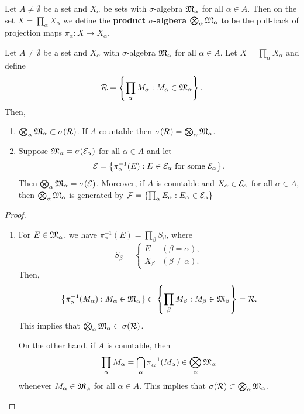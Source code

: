 \documentclass[a4paper]{article}
\begin{document}
\begin{defi}
  Let $A \neq \emptyset$ be a set and $X_\alpha$ be sets
  with $\sigma$-algebra $\mathfrak{M}_\alpha$ for all
    $\alpha \in A$. Then on the set $X = \prod_\alpha X_\alpha$
    we define the \textbf{product $\sigma$-algbera}
    $\bigotimes_\alpha \mathfrak{M}_\alpha$ to be the
    pull-back of projection maps
    $\pi_\alpha : X \to X_\alpha$.
\end{defi}
{
\begin{thm}
  Let $A \neq \emptyset$ be a set and $X_\alpha$
  with $\sigma$-algebra $\mathfrak{M}_\alpha$ for all $\alpha
  \in A$. Let $X = \prod_\alpha X_\alpha$ and
  define
  \[
  \mathcal{R} = \left\{ \prod_\alpha M_\alpha:
  M_\alpha \in \mathfrak{M}_\alpha \right\}.
  \]
  Then,
  \begin{enumerate}
    \item $\bigotimes_\alpha \mathfrak{M}_\alpha \subset \sigma
    (\mathcal{R})$. If $A$ countable then $\sigma(\mathcal{R})
    = \bigotimes_\alpha \mathfrak{M}_\alpha$.

    \item Suppose $\mathfrak{M}_\alpha = \sigma(\mathcal{E}_\alpha)$
    for all $\alpha \in A$ and let
    \[
    \mathcal{E} = \left\{ \pi_\alpha^{-1}(E) :
    E \in \mathcal{E}_\alpha \text{ for some $\mathcal{E}_\alpha$} \right\}.
    \]
    Then $\bigotimes_\alpha \mathfrak{M}_\alpha = \sigma(\mathcal{E})$.
    Moreover, if $A$ is countable and $X_\alpha \in \mathcal{E}_\alpha$
    for all $\alpha \in A$, then $\bigotimes_\alpha \mathfrak{M}_\alpha$
    is generated by $\mathcal{F} = \left\{ \prod_\alpha E_\alpha :
    E_\alpha \in \mathcal{E}_\alpha \right\}$
  \end{enumerate}
\end{thm}

\begin{proof}
\begin{enumerate}
\item For $E \in \mathfrak{M}_\alpha$, we have
$\pi^{-1}_\alpha (E) = \prod_\beta S_\beta$, where
\[
S_\beta = \begin{cases}
  E & (\beta = \alpha), \\
  X_\beta & (\beta \neq \alpha).
\end{cases}
\]
Then,
\[
\left\{ \pi_\alpha^{-1}(M_\alpha) : M_\alpha
\in \mathfrak{M}_\alpha \right\}
\subset \left\{ \prod_\beta M_\beta: M_\beta \in
\mathfrak{M}_\beta \right\} = \mathcal{R}.
\]
This implies that $\bigotimes_\alpha \mathfrak{M}_\alpha \subset
\sigma(\mathcal{R})$.

On the other hand, if $A$ is countable, then
\[
\prod_\alpha M_\alpha =
\bigcap_\alpha \pi_\alpha^{-1} (M_\alpha)
\in \bigotimes_\alpha \mathfrak{M}_\alpha
\]
whenever $M_\alpha \in \mathfrak{M}_\alpha$ for all $\alpha \in A$.
This implies that $\sigma(\mathcal{R}) \subset \bigotimes_\alpha
\mathfrak{M}_\alpha$.


\end{enumerate}
\end{proof}}
\end{document}
